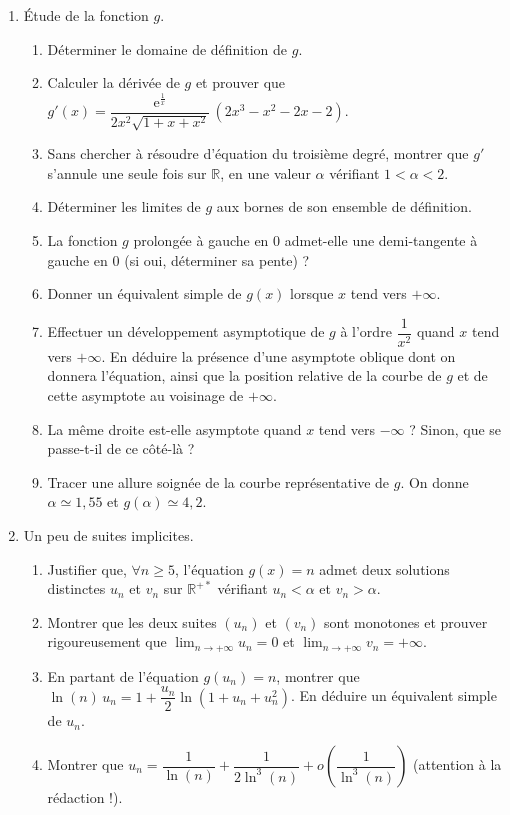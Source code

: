 \documentclass[11pt,a4paper]{article}
\newcommand{\R}{\mathbb{R}}
\newcommand{\ee}{\mathrm{e}}
\begin{document}
\begin{enumerate}
\item Étude de la fonction $g$.
 \begin{enumerate}
 \item Déterminer le domaine de définition de $g$.
 \item Calculer la dérivée de $g$ et prouver que $g'(x)=\dfrac{\ee^{\frac1x}}{2x^2\sqrt{1+x+x^2}}\,(2x^3-x^2-2x-2)$.
 \item Sans chercher à résoudre d'équation du troisième degré, montrer que $g'$ s'annule une seule fois sur $\R$, en une valeur $\alpha$ vérifiant $1<\alpha<2$.
 \item Déterminer les limites de $g$ aux bornes de son ensemble de définition.
 \item La fonction $g$ prolongée à gauche en $0$ admet-elle une demi-tangente à gauche en $0$ (si oui, déterminer sa pente) ?
 \item Donner un équivalent simple de $g(x)$ lorsque $x$ tend vers $+\infty$.
 \item Effectuer un développement asymptotique de $g$ à l'ordre $\dfrac1{x^2}$ quand $x$ tend vers $+\infty$. En déduire la présence d'une asymptote oblique dont on donnera l'équation, ainsi que la position relative de la courbe de $g$ et de cette asymptote au voisinage de $+\infty$.
 \item La même droite est-elle asymptote quand $x$ tend vers $-\infty$ ? Sinon, que se passe-t-il de ce côté-là ?
 \item Tracer une allure soignée de la courbe représentative de $g$. On donne $\alpha\simeq 1{,}55$ et $g(\alpha)\simeq 4{,}2$.
 \end{enumerate}
\item Un peu de suites implicites.
 \begin{enumerate}
 \item Justifier que, $\forall n\geqslant 5$, l'équation $g(x)=n$ admet deux solutions distinctes $u_n$ et $v_n$ sur $\R^{+*}$ vérifiant $u_n<\alpha$ et $v_n>\alpha$.
 \item Montrer que les deux suites $(u_n)$ et $(v_n)$ sont monotones et prouver rigoureusement que $\displaystyle\lim_{n\to+\infty}u_n=0$ et $\displaystyle\lim_{n\to+\infty}v_n=+\infty$.
 \item En partant de l'équation $g(u_n)=n$, montrer que $\ln(n)\,u_n=1+\dfrac{u_n}{2}\ln(1+u_n+u_n^2)$. En déduire un équivalent simple de $u_n$.
 \item Montrer que $u_n=\dfrac{1}{\ln(n)}+\dfrac{1}{2\ln^3(n)}+o\!\left(\dfrac{1}{\ln^3(n)}\right)$ (attention à la rédaction !).

\end{enumerate}
\end{enumerate}
\end{document}
